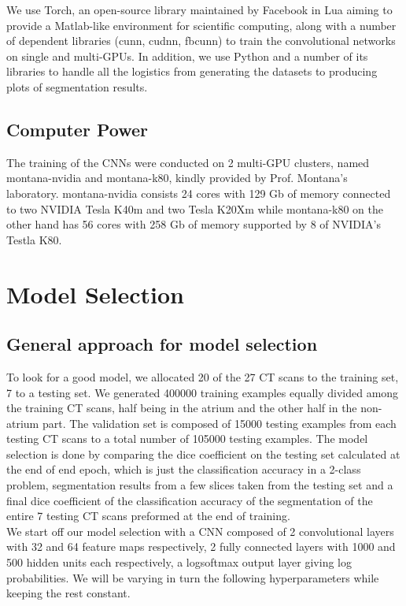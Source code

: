 We use Torch, an open-source library maintained by Facebook in Lua aiming to provide a Matlab-like environment for scientific computing, along with a number of dependent libraries (cunn, cudnn, fbcunn) to train the convolutional networks on single and multi-GPUs. In addition, we use Python and a number of its libraries to handle all the logistics from generating the datasets to producing plots of segmentation results.

\subsection{Computer Power}

The training of the CNNs were conducted on 2 multi-GPU clusters, named montana-nvidia and montana-k80, kindly provided by Prof. Montana's laboratory. montana-nvidia consists 24 cores with 129 Gb of memory connected to two NVIDIA Tesla K40m and two Tesla K20Xm while montana-k80 on the other hand has 56 cores with 258 Gb of memory supported by 8 of NVIDIA's Testla K80. 

\section{Model Selection}

\subsection{General approach for model selection}

To look for a good model, we allocated 20 of the 27 CT scans to the training set, 7 to a testing set. We generated 400000 training examples equally divided among the training CT scans, half being in the atrium and the other half in the non-atrium part. The validation set is composed of 15000 testing examples from each testing CT scans to a total number of 105000 testing examples. The model selection is done by comparing the dice coefficient on the testing set calculated at the end of end epoch, which is just the classification accuracy in a 2-class problem, segmentation results from a few slices taken from the testing set and a final dice coefficient of the classification accuracy of the segmentation of the entire 7 testing CT scans preformed at the end of training.\\

We start off our model selection with a CNN composed of 2 convolutional layers with 32 and 64 feature maps respectively, 2 fully connected layers with 1000 and 500 hidden units each respectively, a logsoftmax output layer giving log probabilities. We will be varying in turn the following hyperparameters while keeping the rest constant.\\


